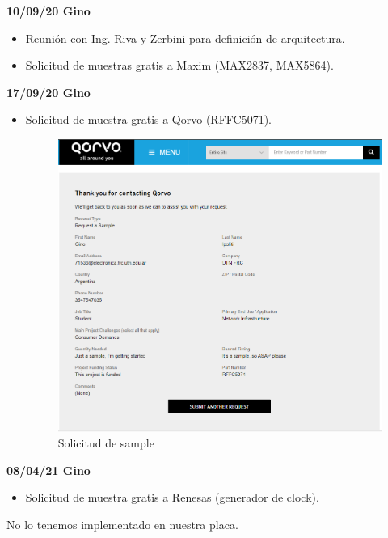 \documentclass[a4paper,12pt]{report} %
\begin{document}
\textbf{10/09/20 Gino}
\begin{itemize}
	\item Reunión con Ing. Riva y Zerbini para definición de arquitectura.
	\item Solicitud de muestras gratis a Maxim (MAX2837, MAX5864).
\end{itemize}
\textbf{17/09/20 Gino}
\begin{itemize}
	\item Solicitud de muestra gratis a Qorvo (RFFC5071).
	\begin{figure}[H]
		\centering
		\includegraphics[scale=0.6]{Imagenes/sample_qorvo}
		\caption{Solicitud de sample}
	\end{figure}
\end{itemize}
\textbf{08/04/21 Gino}
\begin{itemize}
	\item Solicitud de muestra gratis a Renesas (generador de clock).
\end{itemize}




No lo tenemos implementado en nuestra placa.

	

\nocite{*}
\end{document}
